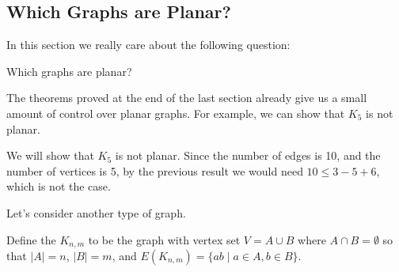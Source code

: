\subsection{Which Graphs are Planar?}

In this section we really care about the following question:
\begin{center}
	Which graphs are planar?
\end{center}

The theorems proved at the end of the last section already give us a small amount of control over planar graphs. For example, we can show that $K_5$ is not planar.

\begin{example}
	We will show that $K_5$ is not planar.
	Since the number of edges is 10, and the number of vertices is 5, by the previous result we would need $10 \leq 3 - 5 + 6$, which is not the case.
\end{example}

Let's consider another type of graph.

\begin{definition}
	Define the  $K_{n, m}$ to be the graph with vertex set $V = A \cup B$ where $A \cap B = \emptyset$ so that $|A| = n$, $|B| = m$, and $E(K_{n, m}) = \{ab \mid a \in A, b \in B\}$.
	\end{definition}

